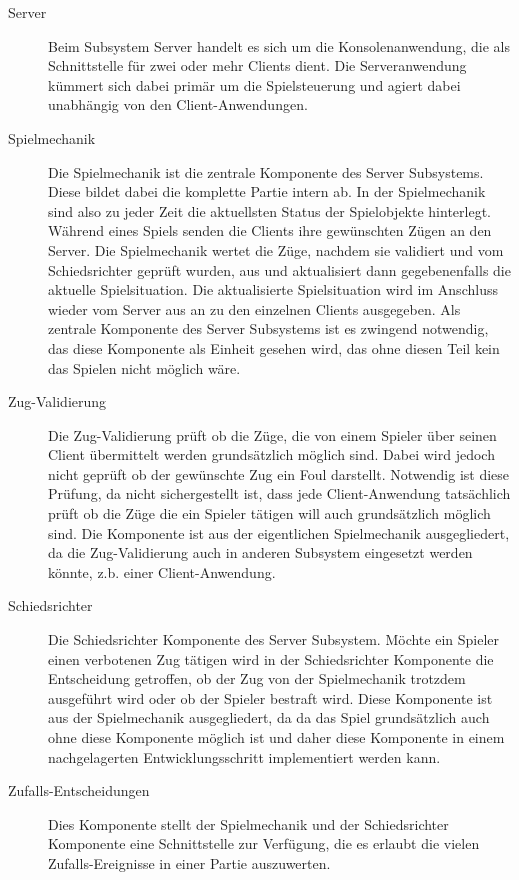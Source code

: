 		\begin{description}
			
			\item[Server]
			Beim Subsystem Server handelt es sich um die Konsolenanwendung, die als Schnittstelle für zwei oder mehr Clients dient. Die Serveranwendung kümmert sich dabei primär um die Spielsteuerung und agiert dabei unabhängig von den Client-Anwendungen.
			
			\item[Spielmechanik]
			Die Spielmechanik ist die zentrale Komponente des Server Subsystems. Diese bildet dabei die komplette Partie intern ab. In der Spielmechanik sind also zu jeder Zeit die aktuellsten Status der Spielobjekte hinterlegt. Während eines Spiels senden die Clients ihre gewünschten Zügen an den Server. Die Spielmechanik wertet die Züge, nachdem sie validiert und vom Schiedsrichter geprüft wurden, aus und aktualisiert dann gegebenenfalls die aktuelle Spielsituation. Die aktualisierte Spielsituation wird im Anschluss wieder vom Server aus an zu den einzelnen Clients ausgegeben. Als zentrale Komponente des Server Subsystems ist es zwingend notwendig, das diese Komponente als Einheit gesehen wird, das ohne diesen Teil kein das Spielen nicht möglich wäre.
			
			\item[Zug-Validierung]
			Die Zug-Validierung prüft ob die Züge, die von einem Spieler über seinen Client übermittelt werden grundsätzlich möglich sind. Dabei wird jedoch nicht geprüft ob der gewünschte Zug ein Foul darstellt. Notwendig ist diese Prüfung, da nicht sichergestellt ist, dass jede Client-Anwendung tatsächlich prüft ob die Züge die ein Spieler tätigen will auch grundsätzlich möglich sind. Die Komponente ist aus der eigentlichen Spielmechanik ausgegliedert, da die Zug-Validierung auch in anderen Subsystem eingesetzt werden könnte, z.b. einer Client-Anwendung.			
			
			\item[Schiedsrichter]
			Die Schiedsrichter Komponente des Server Subsystem. Möchte ein Spieler einen verbotenen Zug tätigen wird in der Schiedsrichter Komponente die Entscheidung getroffen, ob der Zug von der Spielmechanik trotzdem ausgeführt wird oder ob der Spieler bestraft wird. Diese Komponente ist aus der Spielmechanik ausgegliedert, da da das Spiel grundsätzlich auch ohne diese Komponente möglich ist und daher diese Komponente in einem nachgelagerten Entwicklungsschritt implementiert werden kann.
			
			\item[Zufalls-Entscheidungen]
			Dies Komponente stellt der Spielmechanik und der Schiedsrichter Komponente eine Schnittstelle zur Verfügung, die es erlaubt die vielen Zufalls-Ereignisse in einer Partie auszuwerten.
			

\end{description}
